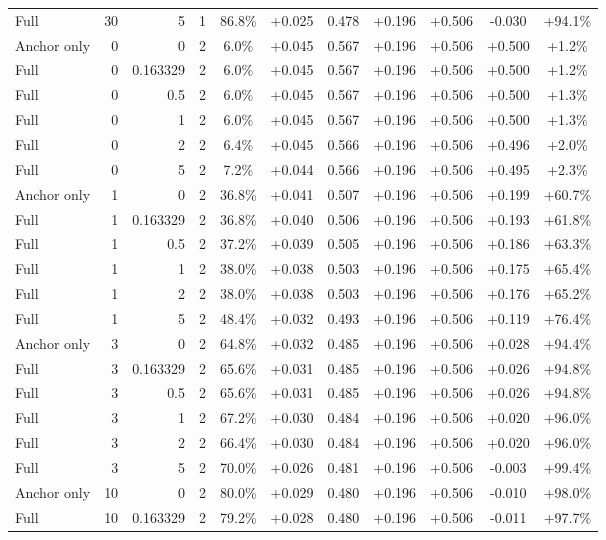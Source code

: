 \begin{table}[htbp]
\begin{tabular}{lrrrccccccc}
Full & 30 & 5 & 1 & 86.8\% & +0.025 & 0.478 & +0.196 & +0.506 & -0.030 & +94.1\% \\
Anchor only & 0 & 0 & 2 & 6.0\% & +0.045 & 0.567 & +0.196 & +0.506 & +0.500 & +1.2\% \\
Full & 0 & 0.163329 & 2 & 6.0\% & +0.045 & 0.567 & +0.196 & +0.506 & +0.500 & +1.2\% \\
Full & 0 & 0.5 & 2 & 6.0\% & +0.045 & 0.567 & +0.196 & +0.506 & +0.500 & +1.3\% \\
Full & 0 & 1 & 2 & 6.0\% & +0.045 & 0.567 & +0.196 & +0.506 & +0.500 & +1.3\% \\
Full & 0 & 2 & 2 & 6.4\% & +0.045 & 0.566 & +0.196 & +0.506 & +0.496 & +2.0\% \\
Full & 0 & 5 & 2 & 7.2\% & +0.044 & 0.566 & +0.196 & +0.506 & +0.495 & +2.3\% \\
Anchor only & 1 & 0 & 2 & 36.8\% & +0.041 & 0.507 & +0.196 & +0.506 & +0.199 & +60.7\% \\
Full & 1 & 0.163329 & 2 & 36.8\% & +0.040 & 0.506 & +0.196 & +0.506 & +0.193 & +61.8\% \\
Full & 1 & 0.5 & 2 & 37.2\% & +0.039 & 0.505 & +0.196 & +0.506 & +0.186 & +63.3\% \\
Full & 1 & 1 & 2 & 38.0\% & +0.038 & 0.503 & +0.196 & +0.506 & +0.175 & +65.4\% \\
Full & 1 & 2 & 2 & 38.0\% & +0.038 & 0.503 & +0.196 & +0.506 & +0.176 & +65.2\% \\
Full & 1 & 5 & 2 & 48.4\% & +0.032 & 0.493 & +0.196 & +0.506 & +0.119 & +76.4\% \\
Anchor only & 3 & 0 & 2 & 64.8\% & +0.032 & 0.485 & +0.196 & +0.506 & +0.028 & +94.4\% \\
Full & 3 & 0.163329 & 2 & 65.6\% & +0.031 & 0.485 & +0.196 & +0.506 & +0.026 & +94.8\% \\
Full & 3 & 0.5 & 2 & 65.6\% & +0.031 & 0.485 & +0.196 & +0.506 & +0.026 & +94.8\% \\
Full & 3 & 1 & 2 & 67.2\% & +0.030 & 0.484 & +0.196 & +0.506 & +0.020 & +96.0\% \\
Full & 3 & 2 & 2 & 66.4\% & +0.030 & 0.484 & +0.196 & +0.506 & +0.020 & +96.0\% \\
Full & 3 & 5 & 2 & 70.0\% & +0.026 & 0.481 & +0.196 & +0.506 & -0.003 & +99.4\% \\
Anchor only & 10 & 0 & 2 & 80.0\% & +0.029 & 0.480 & +0.196 & +0.506 & -0.010 & +98.0\% \\
Full & 10 & 0.163329 & 2 & 79.2\% & +0.028 & 0.480 & +0.196 & +0.506 & -0.011 & +97.7\% \\

\end{tabular}
\end{table}

